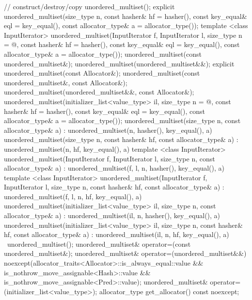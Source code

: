 \begin{codeblock}
{{    // construct/destroy/copy
    unordered_multiset();
    explicit unordered_multiset(size_type n,
                                const hasher& hf = hasher(),
                                const key_equal& eql = key_equal(),
                                const allocator_type& a = allocator_type());
    template <class InputIterator>
      unordered_multiset(InputIterator f, InputIterator l,
                         size_type n = @\seebelow@,
                         const hasher& hf = hasher(),
                         const key_equal& eql = key_equal(),
                         const allocator_type& a = allocator_type());
    unordered_multiset(const unordered_multiset&);
    unordered_multiset(unordered_multiset&&);
    explicit unordered_multiset(const Allocator&);
    unordered_multiset(const unordered_multiset&, const Allocator&);
    unordered_multiset(unordered_multiset&&, const Allocator&);
    unordered_multiset(initializer_list<value_type> il,
                       size_type n = @\seebelow@,
                       const hasher& hf = hasher(),
                       const key_equal& eql = key_equal(),
                       const allocator_type& a = allocator_type());
    unordered_multiset(size_type n, const allocator_type& a)
      : unordered_multiset(n, hasher(), key_equal(), a) { }
    unordered_multiset(size_type n, const hasher& hf, const allocator_type& a)
      : unordered_multiset(n, hf, key_equal(), a) { }
    template <class InputIterator>
      unordered_multiset(InputIterator f, InputIterator l, size_type n, const allocator_type& a)
        : unordered_multiset(f, l, n, hasher(), key_equal(), a) { }
    template <class InputIterator>
      unordered_multiset(InputIterator f, InputIterator l, size_type n, const hasher& hf, 
                         const allocator_type& a)
      : unordered_multiset(f, l, n, hf, key_equal(), a) { }
    unordered_multiset(initializer_list<value_type> il, size_type n, const allocator_type& a)
      : unordered_multiset(il, n, hasher(), key_equal(), a) { }
    unordered_multiset(initializer_list<value_type> il, size_type n, const hasher& hf, 
                       const allocator_type& a)
      : unordered_multiset(il, n, hf, key_equal(), a) { }
    ~unordered_multiset();
    unordered_multiset& operator=(const unordered_multiset&);
    unordered_multiset& operator=(unordered_multiset&&)
      noexcept(allocator_traits<Allocator>::is_always_equal::value &&
               is_nothrow_move_assignable<Hash>::value &&
               is_nothrow_move_assignable<Pred>::value);
    unordered_multiset& operator=(initializer_list<value_type>);
    allocator_type get_allocator() const noexcept;

}}
\end{codeblock}
